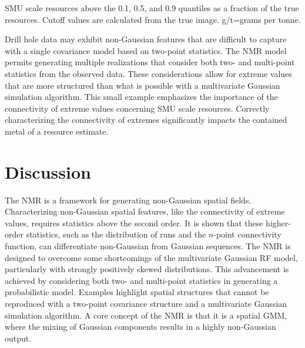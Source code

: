 \begin{table}[!htb]
    \centering
    \caption{\Gls{SMU} scale resources above the 0.1, 0.5, and 0.9 quantiles as a fraction of the true resources. Cutoff values are calculated from the true image. g/t=grams per tonne.}
    \resizebox{1\width}{!}{}
    \label{tab:lightning_resources}
\end{table}

Drill hole data may exhibit non-Gaussian features that are difficult to capture with a single covariance model based on two-point statistics. The \gls{NMR} model permits generating multiple realizations that consider both two- and multi-point statistics from the observed data. These considerations allow for extreme values that are more structured than what is possible with a multivariate Gaussian simulation algorithm. This small example emphasizes the importance of the connectivity of extreme values concerning \gls{SMU} scale resources. Correctly characterizing the connectivity of extremes significantly impacts the contained metal of a resource estimate.

\FloatBarrier
\section{Discussion}
\label{sec:03discuss}

The \gls{NMR} is a framework for generating non-Gaussian spatial fields. Characterizing non-Gaussian spatial features, like the connectivity of extreme values, requires statistics above the second order. It is shown that these higher-order statistics, such as the distribution of runs and the $n$-point connectivity function, can differentiate non-Gaussian from Gaussian sequences. The \gls{NMR} is designed to overcome some shortcomings of the multivariate Gaussian \gls{RF} model, particularly with strongly positively skewed distributions. This advancement is achieved by considering both two- and multi-point statistics in generating a probabilistic model. Examples highlight spatial structures that cannot be reproduced with a two-point covariance structure and a multivariate Gaussian simulation algorithm. A core concept of the \gls{NMR} is that it is a spatial \gls{GMM}, where the mixing of Gaussian components results in a highly non-Gaussian output.

